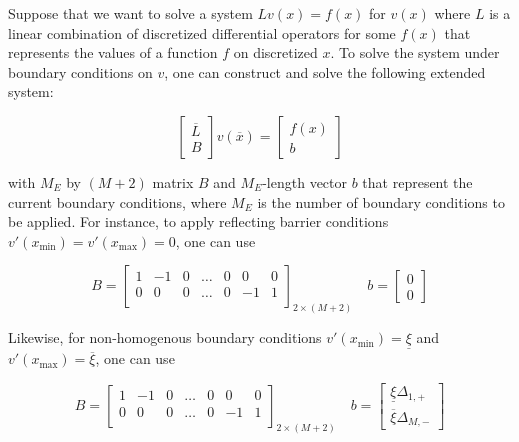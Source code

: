 \documentclass[11pt]{article}
\begin{document}
Suppose that we want to solve a system $L v({x}) = f(x) $ for $v(x)$ where $L$ is a linear combination of discretized differential operators for some $f(x)$ that represents the values of a function $f$ on discretized $x$. To solve the system under boundary conditions on $v$, one can construct and solve the following extended system:

\begin{equation}\label{eq:extended-system}
\begin{bmatrix}
\overline{L} \\
B
\end{bmatrix} 
v(\overline{x}) = 
\begin{bmatrix}
f(x) \\
b
\end{bmatrix} 
\end{equation}

with $M_E$ by $(M+2)$ matrix $B$ and $M_E$-length vector $b$ that represent the current boundary conditions, where $M_E$ is the number of boundary conditions to be applied. For instance, to apply reflecting barrier conditions $v'(x_{\min}) = v'(x_{\max}) = 0$, one can use

\begin{equation}\label{eq:reflecting-barrier-matrix}
B = \begin{bmatrix}
1 & -1 & 0 & \dots & 0 & 0 & 0 \\
0 & 0 & 0 & \dots & 0 & -1 & 1\\
\end{bmatrix}_{2 \times (M+2)} \quad 
b = \begin{bmatrix}
0 \\
0
\end{bmatrix}
\end{equation}

Likewise, for non-homogenous boundary conditions $v'(x_{\min}) = \underline{\xi}$ and $v'(x_{\max}) = \overline{\xi}$, one can use

\begin{equation}\label{eq:mixed-boundary-matrix}
B = \begin{bmatrix}
1 & -1 & 0 & \dots & 0 & 0 & 0 \\
0 & 0 & 0 & \dots & 0 & -1 & 1\\
\end{bmatrix}_{2 \times (M+2)} \quad 
b = \begin{bmatrix}
 \underline{\xi} \Delta_{1,+} \\
\overline{\xi} \Delta_{M,-}
\end{bmatrix}
\end{equation}
\end{document}
